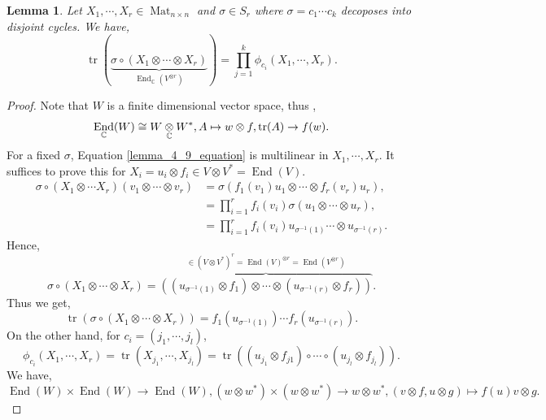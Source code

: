 \documentclass[10pt]{article}
\newtheorem{lemma}{Lemma}[section]
\numberwithin{equation}{theorem}
\DeclareMathOperator{\tr}{tr}
\DeclareMathOperator{\End}{End}
\DeclareMathOperator{\Mat}{Mat}
\newcommand{\C}[0]{\mathbb{C}}
\newcommand{\tens}[1]{%
  \mathbin{\mathop{\otimes}\displaylimits_{#1}}%
}
\begin{document}
\begin{lemma}
  \label{lemma_4_9}
  Let $X_1,\cdots,X_r\in\Mat_{n\times n}$ and $\sigma\in S_r$ where $\sigma = c_1\cdots c_k$ decoposes into disjoint cycles. We have,
  \begin{equation}
    \tr(\underbrace{\sigma\circ(X_1\otimes\cdots\otimes X_r)}_{\End_\C(V^{\otimes r})})=\prod_{j=1}^k \phi_{c_i}(X_1,\cdots,X_r).
    \label{lemma_4_9_equation}
  \end{equation}
\end{lemma}
\begin{proof}
  Note that $W$ is a finite dimensional vector space, thus ,
  \begin{equation*}
    \End_\C(W)\cong W\tens{\C}W^*, A\mapsto w\otimes f, \tr(A)\to f(w).
  \end{equation*}
  For a fixed $\sigma$, Equation \eqref{lemma_4_9_equation} is multilinear in $X_1,\cdots, X_r$. It suffices to prove this for $X_i=u_i\otimes f_i\in V\otimes V^* = \End(V)$. 
  \begin{align*}
    \sigma\circ(X_1\otimes\cdots X_r)(v_1\otimes \cdots\otimes v_r) & = \sigma(f_1(v_1)u_1\otimes \cdots\otimes f_r(v_r)u_r),\\
    & = \prod_{i=1}^r f_i(v_i)\sigma(u_1\otimes \cdots\otimes u_r),\\
    & = \prod_{i=1}^rf_i(v_i)u_{\sigma^{-1}(1)}\cdots\otimes u_{\sigma^{-1}(r)}.
  \end{align*}
  Hence,
  \begin{equation*}
    \sigma\circ(X_1\otimes \cdots\otimes X_r) = \overbrace{((u_{\sigma^{-1}(1)}\otimes f_1)\otimes\cdots\otimes (u_{\sigma^{-1}(r)}\otimes f_r))}^{\in(V\otimes V^*)^r=\End(V)^{\otimes r}=\End(V^{\otimes r})}.
  \end{equation*}
  Thus we get,
  \begin{equation*}
    \tr(\sigma\circ(X_1\otimes \cdots\otimes X_r)) = f_1(u_{\sigma^{-1}(1)})\cdots f_r(u_{\sigma^{-1}(r)}).
  \end{equation*}
  On the other hand, for $c_i=(j_{1},\cdots,j_{l})$,
  \begin{equation*}
    \phi_{c_i}(X_1,\cdots,X_r) = \tr(X_{j_{1}},\cdots,X_{j_{l}}) = \tr((u_{j_1}\otimes f_{j1})\circ \cdots\circ (u_{j_l}\otimes f_{j_l})).
  \end{equation*}
  We have,
  \begin{equation*}
    \End(W)\times \End(W) \to \End(W), (w\otimes w^*)\times (w\otimes w^*)\to w\otimes w^*, (v\otimes f,u\otimes g)\mapsto f(u)v\otimes g.

\end{equation*}
\end{proof}
\end{document}
